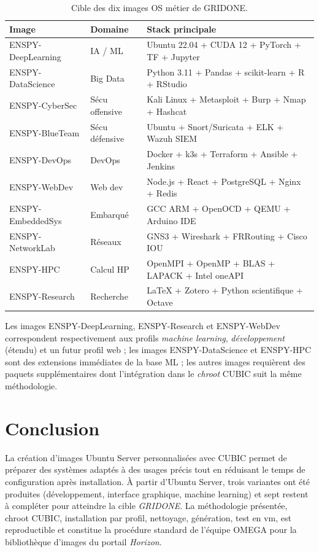 \begin{table}[H]
\centering
\small
\caption{Cible des dix images OS métier de GRIDONE.}
\begin{tabular}{lll}
\toprule
\textbf{Image} & \textbf{Domaine} & \textbf{Stack principale} \\
\midrule
ENSPY-DeepLearning & IA / ML        & Ubuntu 22.04 + CUDA 12 + PyTorch + TF + Jupyter \\
ENSPY-DataScience  & Big Data       & Python 3.11 + Pandas + scikit-learn + R + RStudio \\
ENSPY-CyberSec     & Sécu offensive & Kali Linux + Metasploit + Burp + Nmap + Hashcat \\
ENSPY-BlueTeam     & Sécu défensive & Ubuntu + Snort/Suricata + ELK + Wazuh SIEM \\
ENSPY-DevOps       & DevOps         & Docker + k3s + Terraform + Ansible + Jenkins \\
ENSPY-WebDev       & Web dev        & Node.js + React + PostgreSQL + Nginx + Redis \\
ENSPY-EmbeddedSys  & Embarqué       & GCC ARM + OpenOCD + QEMU + Arduino IDE \\
ENSPY-NetworkLab   & Réseaux        & GNS3 + Wireshark + FRRouting + Cisco IOU \\
ENSPY-HPC          & Calcul HP      & OpenMPI + OpenMP + BLAS + LAPACK + Intel oneAPI \\
ENSPY-Research     & Recherche      & LaTeX + Zotero + Python scientifique + Octave \\
\bottomrule
\end{tabular}

\label{tab:images-cible}
\end{table}

Les images ENSPY-DeepLearning, ENSPY-Research et ENSPY-WebDev correspondent respectivement aux profils \emph{machine learning}, \emph{développement} (étendu) et un futur profil web ; les images ENSPY-DataScience et ENSPY-HPC sont des extensions immédiates de la base ML ; les autres images requièrent des paquets supplémentaires dont l'intégration dans le \emph{chroot} CUBIC suit la même méthodologie.

\section{Conclusion}

La création d'images Ubuntu Server personnalisées avec CUBIC permet de préparer des systèmes adaptés à des usages précis tout en réduisant le temps de configuration après installation. À partir d'Ubuntu Server, trois variantes ont été produites (développement, interface graphique, machine learning) et sept restent à compléter pour atteindre la cible \emph{GRIDONE}. La méthodologie présentée, chroot CUBIC, installation par profil, nettoyage, génération, test en \acrshort{vm}, est reproductible et constitue la procédure standard de l'équipe OMEGA pour la bibliothèque d'images du portail \emph{Horizon}.
